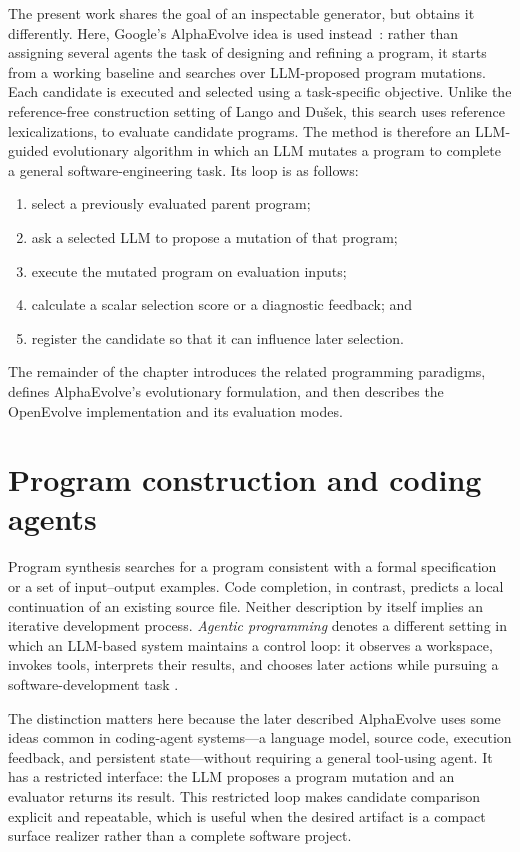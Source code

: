 The present work shares the goal of an inspectable generator, but
obtains it differently. Here, Google's AlphaEvolve idea is
used instead~\cite{novikov2025alphaevolve}: rather than assigning several agents the task of
designing and refining a program, it starts from a working baseline and searches
over LLM-proposed program mutations. Each candidate is executed and selected
using a task-specific objective. Unlike the reference-free construction setting
of Lango and Du\v{s}ek, this search uses reference
lexicalizations, to evaluate candidate programs.
The method is therefore an LLM-guided evolutionary algorithm 
in which an LLM mutates a program to complete a general
software-engineering task. Its loop is as follows:
\begin{enumerate}
  \item select a previously evaluated parent program;
  \item ask a selected LLM to propose a mutation of that program;
  \item execute the mutated program on evaluation inputs;
  \item calculate a scalar selection score or a diagnostic feedback; and
  \item register the candidate so that it can influence later selection.
\end{enumerate}
The remainder of the chapter introduces the related programming paradigms,
defines AlphaEvolve's evolutionary formulation, and then describes the
OpenEvolve implementation and its evaluation modes.

\section{Program construction and coding agents}
\label{sec:modern-programming}

Program synthesis searches for a program consistent with a formal specification
or a set of input--output examples. Code completion, in contrast, predicts a
local continuation of an existing source file. Neither description by itself
implies an iterative development process. \emph{Agentic programming} denotes a
different setting in which an LLM-based system maintains a control loop: it
observes a workspace, invokes tools, interprets their results, and chooses later
actions while pursuing a software-development task
\cite{wang2025agenticprogramming}.

The distinction matters here because the later described AlphaEvolve uses some ideas common in
coding-agent systems---a language model, source code, execution feedback, and
persistent state---without requiring a general tool-using agent. It has a
restricted interface: the LLM proposes a program mutation and an evaluator
returns its result. This restricted loop makes candidate comparison explicit and
repeatable, which is useful when the desired artifact is a compact surface
realizer rather than a complete software project.

